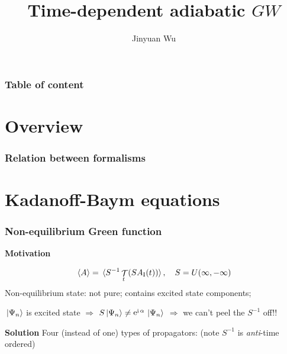 \documentclass[t]{beamer}
\title{Time-dependent adiabatic $GW$}
\author{Jinyuan Wu}
\DeclareMathOperator{\ee}{e}
\DeclareMathOperator{\ii}{i}
\DeclareMathOperator{\timeorder}{\mathcal{T}}
\begin{document}
\maketitle

\begin{frame}
\frametitle{Table of content}

\tableofcontents    

\end{frame}

\section{Overview}

\begin{frame}
\frametitle{Relation between formalisms}

\begin{center}
    
\end{center}    

\end{frame}

\section{Kadanoff-Baym equations}

\begin{frame}
\frametitle{Non-equilibrium Green function}

\textbf{Motivation} 

\begin{equation}
    \expval*{A} = \expval*{S^{-1} \timeorder_t ( S A_{\text{I}}(t) )}, \quad S = U(\infty, -\infty)
\end{equation}
Non-equilibrium state: not pure; contains excited state components;

$\ket*{\Psi_n}$ is excited state $\Rightarrow$ $S \ket*{\Psi_n} \neq \ee^{\ii \alpha} \ket*{\Psi_n}$
$\Rightarrow$ we can't peel the $S^{-1}$ off!!

\vspace{0.5cm}

\textbf{Solution} Four (instead of one) types of propagators: (note $S^{-1}$ is \emph{anti}-time ordered)

\begin{center}
    \small
        
\end{center}

\end{frame}
\end{document}
